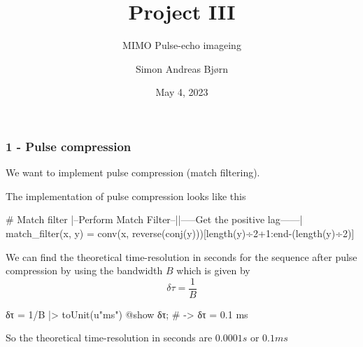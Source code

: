 \documentclass[compress,aspectratio=169]{beamer}
\title{Project III}
\subtitle{MIMO Pulse-echo imageing}
\author{Simon Andreas Bjørn}
\date{May 4, 2023}
\begin{document}
\begin{frame}
    \maketitle
\end{frame}

\begin{frame}[fragile] %
    \frametitle{1 - Pulse compression}
    We want to implement pulse compression (match filtering).
    
    The implementation of pulse compression looks like this
    \begin{jllisting}[gobble=8]
        # Match filter      |--Perform Match Filter--||-----Get the positive lag------|
        match_filter(x, y) = conv(x, reverse(conj(y)))[length(y)÷2+1:end-(length(y)÷2)]
    \end{jllisting}
    We can find the theoretical time-resolution in seconds for the sequence after
    pulse compression by using the bandwidth $B$ which is given by
    $$
        \delta\tau = \frac{1}{B}
    $$
    \begin{jllisting}[gobble=8]
        δτ = 1/B |> toUnit(u"ms")
        @show δτ; # -> δτ = 0.1 ms
    \end{jllisting}
    So the theoretical time-resolution in seconds are $0.0001s$ or $0.1ms$
\end{frame}
\end{document}
